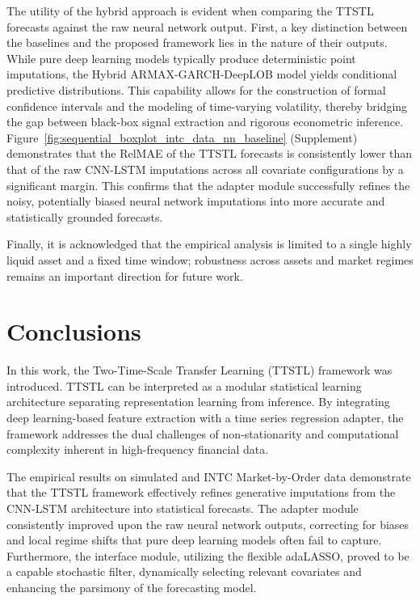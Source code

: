 \documentclass{rQUF2e}
\theoremstyle{plain}
\theoremstyle{definition}
\theoremstyle{remark}
\begin{document}
The utility of the hybrid approach is evident when comparing the TTSTL forecasts against the raw neural network output. First, a key distinction between the baselines and the proposed framework lies in the nature of their outputs. While pure deep learning models typically produce deterministic point imputations, the Hybrid ARMAX-GARCH-DeepLOB model yields conditional predictive distributions. This capability allows for the construction of formal confidence intervals and the modeling of time-varying volatility, thereby bridging the gap between black-box signal extraction and rigorous econometric inference. Figure~\ref{fig:sequential_boxplot_intc_data_nn_baseline} (Supplement) demonstrates that the RelMAE of the TTSTL forecasts is consistently lower than that of the raw CNN-LSTM imputations across all covariate configurations by a significant margin. This confirms that the adapter module successfully refines the noisy, potentially biased neural network imputations into more accurate and statistically grounded forecasts.

Finally, it is acknowledged that the empirical analysis is limited to a single highly liquid asset and a fixed time window; robustness across assets and market regimes remains an important direction for future work.

\section{Conclusions}
\label{Sect:Conclusions}

In this work, the Two-Time-Scale Transfer Learning (TTSTL) framework was introduced. TTSTL can be interpreted as a modular statistical learning architecture separating representation learning from inference. By integrating deep learning-based feature extraction with a time series regression adapter, the framework addresses the dual challenges of non-stationarity and computational complexity inherent in high-frequency financial data.

The empirical results on simulated and INTC Market-by-Order data demonstrate that the TTSTL framework effectively refines generative imputations from the CNN-LSTM architecture into statistical forecasts. The adapter module consistently improved upon the raw neural network outputs, correcting for biases and local regime shifts that pure deep learning models often fail to capture. Furthermore, the interface module, utilizing the flexible adaLASSO, proved to be a capable stochastic filter, dynamically selecting relevant covariates and enhancing the parsimony of the forecasting model.
\end{document}
